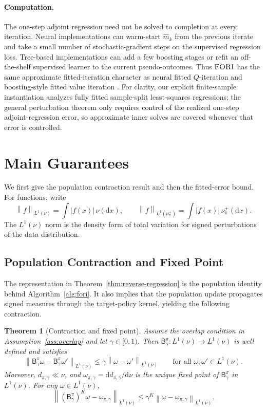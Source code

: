 \documentclass{article}
\newcommand{\mhat}{\widehat m}
\newcommand{\1}{\mathbf{1}}
\newcommand{\dd}{\mathrm{d}}
\newcommand{\nup}{\nu_\pi^+}
\newcommand{\omegastar}{\omega_{\pi,\gamma}}
\newcommand{\Bpig}{\mathsf{B}_\gamma^\pi}
\newcommand{\norm}[2][]{\left\lVert #2 \right\rVert_{#1}}
\newcommand{\LoneNu}[1]{\norm[L^1(\nu)]{#1}}
\newcommand{\LoneNuPlus}[1]{\norm[L^1(\nu_\pi^+)]{#1}}
\newcommand{\abs}[1]{\left\lvert #1 \right\rvert}
\theoremstyle{plain}
\newtheorem{theorem}{Theorem}[section]
\theoremstyle{definition}
\theoremstyle{remark}
\begin{document}
\paragraph{Computation.}
The one-step adjoint regression need not be solved to completion at every
iteration. Neural implementations can warm-start \(\mhat_k\) from the previous
iterate and take a small number of stochastic-gradient steps on the supervised
regression loss. Tree-based implementations can add a few boosting stages or
refit an off-the-shelf supervised learner to the current pseudo-outcomes. Thus
\(\textsc{FORI}\) has the same approximate fitted-iteration character as neural
fitted \(Q\)-iteration and boosting-style fitted value iteration
\citep{riedmiller2005neural,tosatto2017boosted}. For clarity, our explicit
finite-sample instantiation analyzes fully fitted sample-split least-squares
regressions; the general perturbation theorem only requires control of the
realized one-step adjoint-regression error, so approximate inner solves are
covered whenever that error is controlled.

\section{Main Guarantees}
\label{sec:main-guarantees}

We first give the population contraction result and then the fitted-error bound.
For functions, write
\[
    \LoneNu{f}=\int \abs{f(x)}\,\nu(\dd x),
    \qquad
    \LoneNuPlus{f}=\int \abs{f(x)}\,\nup(\dd x).
\]
The $L^1(\nu)$ norm is the density form of total variation for signed
perturbations of the data distribution.

\subsection{Population Contraction and Fixed Point}

The representation in Theorem~\ref{thm:reverse-regression} is the population
identity behind Algorithm~\ref{alg:fori}. It also implies that the population
update propagates signed measures through the target-policy kernel, yielding the
following contraction.

\begin{theorem}[Contraction and fixed point]
\label{thm:population-contraction}
Assume the overlap condition in Assumption~\ref{ass:overlap} and let $\gamma\in[0,1)$. Then
$\Bpig:L^1(\nu)\to L^1(\nu)$ is well defined and satisfies
\[
    \LoneNu{\Bpig\omega-\Bpig\omega'}
    \leq
    \gamma\LoneNu{\omega-\omega'}
    \qquad
    \text{for all }\omega,\omega'\in L^1(\nu).
\]
Moreover, $d_{\pi,\gamma}\ll\nu$, and
$\omegastar=\dd d_{\pi,\gamma}/\dd\nu$ is the unique fixed point of $\Bpig$ in
$L^1(\nu)$. For any $\omega\in L^1(\nu)$,
\[
    \LoneNu{(\Bpig)^K\omega-\omegastar}
    \leq
    \gamma^K\LoneNu{\omega-\omegastar}.
\]
\end{theorem}
\end{document}
